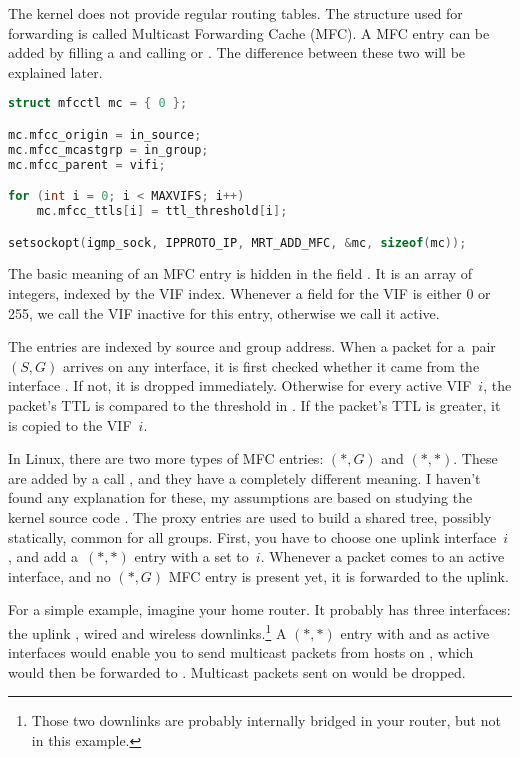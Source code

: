 The kernel does not provide regular routing tables. The structure used for
forwarding is called Multicast Forwarding Cache (MFC). A MFC entry can be added
by filling a  and calling  or
. The difference between these two will be
explained later.

\begin{lstlisting}[language=c]
struct mfcctl mc = { 0 };

mc.mfcc_origin = in_source;
mc.mfcc_mcastgrp = in_group;
mc.mfcc_parent = vifi;

for (int i = 0; i < MAXVIFS; i++)
    mc.mfcc_ttls[i] = ttl_threshold[i];

setsockopt(igmp_sock, IPPROTO_IP, MRT_ADD_MFC, &mc, sizeof(mc));
\end{lstlisting}

\noindent The basic meaning of an MFC entry is hidden in the field . It is
an array of  integers, indexed by the VIF index. Whenever a field for the VIF is
either 0 or 255, we call the VIF inactive for this entry, otherwise we call it
active.

The entries are indexed by source and group address. When a packet for a~pair $(S,G)$
arrives on any interface, it is first checked whether it came from the
interface . If not, it is dropped immediately. Otherwise
for every active VIF~$i$, the packet's TTL is compared to the threshold in
. If the packet's TTL is greater, it is copied to the
VIF~$i$.

In Linux, there are two more types of MFC entries: $(*,G)$ and $(*,*)$. These
are added by a call , and they have a completely different
meaning. I haven't found any explanation for these, my assumptions are based on
studying the kernel source code \cite{linux}. The proxy entries are used to build a shared
tree, possibly statically, common for all groups. First, you have to choose one
uplink interface~$i$, and add a~$(*,*)$ entry with a  set
to~$i$. Whenever a packet comes to an active interface, and no $(*, G)$ MFC
entry is present yet, it is forwarded to the uplink.

For a simple example, imagine your home router. It probably has three
interfaces: the uplink , wired  and wireless
 downlinks.\footnote{Those two downlinks are probably internally
bridged in your router, but not in this example.} A $(*,*)$ entry with
 and  as active interfaces would enable you to send
multicast packets from hosts on , which would then be forwarded to
. Multicast packets sent on  would be dropped.


